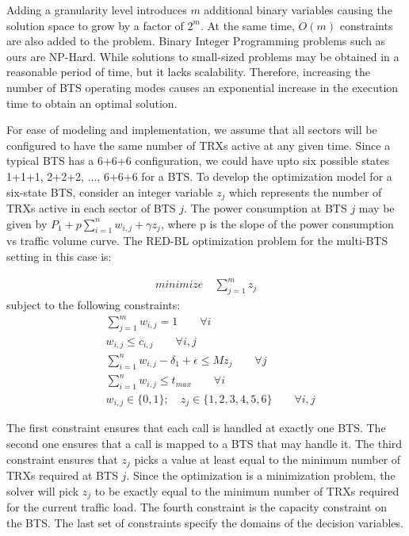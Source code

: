 Adding a granularity level introduces $m$ additional binary variables causing the solution space to grow by a factor of $2^m$. At the same time, $O(m)$ constraints are also added to the problem. Binary Integer Programming problems such as ours are NP-Hard. While solutions to small-sized problems may be obtained in a reasonable period of time, but it lacks scalability. Therefore, increasing the number of BTS operating modes causes an exponential increase in the execution time to obtain an optimal solution. 

For ease of modeling and implementation, we assume that all sectors will be configured to have the same number of TRXs active at any given time. Since a typical BTS has a 6+6+6 configuration, we could have upto six possible states 1+1+1, 2+2+2, ..., 6+6+6 for a BTS. To develop the optimization model for a six-state BTS, consider an integer variable $z_j$ which represents the number of TRXs active in each sector of BTS $j$. The power consumption at BTS $j$ may be given by $P_1 + p \sum_{i=1}^{n} w_{i,j} + \gamma z_j$, where p is the slope of the power consumption vs traffic volume curve. The RED-BL optimization problem for the multi-BTS setting in this case is:

\begin{align}
\textit{minimize} \quad \sum_{j=1}^{m} z_j
\end{align}
subject to the following constraints:
\begin{align}
& \sum_{j=1}^m w_{i,j} = 1 \qquad \forall i \\
& w_{i,j} \leq c_{i,j} \qquad \forall i, j \\
& \sum_{i=1}^nw_{i,j}-\delta_1 +\epsilon \leq Mz_j \qquad \forall j \\
& \sum_{i=1}^n w_{i,j} \le t_{max} \qquad \forall i \\
& w_{i,j} \in \{0,1\}; \quad z_j \in \{1,2,3,4,5,6\}\qquad \forall i, j%
\end{align}

The first constraint ensures that each call is handled at exactly one BTS. The second one ensures that a call is mapped to a BTS that may handle it. The third constraint ensures that $z_j$ picks a value at least equal to the minimum number of TRXs required at BTS $j$. Since the optimization is a minimization problem, the solver will pick $z_j$ to be exactly equal to the minimum number of TRXs required for the current traffic load. The fourth constraint is the capacity constraint on the BTS. The last set of constraints specify the domains of the decision variables.

